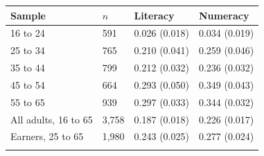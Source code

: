 \setlength{\tabcolsep}{4pt}
\begin{tabular}{@{}llll@{}}
\toprule
Sample & $n$ & Literacy & Numeracy\\
\midrule
16 to 24 & 591 & 0.026 (0.018) & 0.034 (0.019)\\
25 to 34 & 765 & 0.210 (0.041) & 0.259 (0.046)\\
35 to 44 & 799 & 0.212 (0.032) & 0.236 (0.032)\\
45 to 54 & 664 & 0.293 (0.050) & 0.349 (0.043)\\
55 to 65 & 939 & 0.297 (0.033) & 0.344 (0.032)\\
All adults, 16 to 65 & 3,758 & 0.187 (0.018) & 0.226 (0.017)\\
Earners, 25 to 65 & 1,980 & 0.243 (0.025) & 0.277 (0.024)\\
\botrule
\end{tabular}
